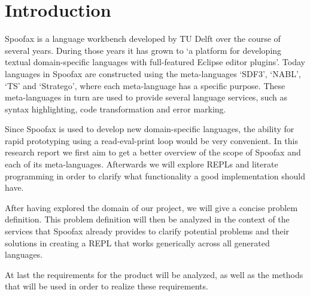 \section*{Introduction}
\label{sec:introduction}

Spoofax is a language workbench developed by TU Delft over the course of several
years. During those years it has grown to `a platform for developing textual
domain-specific languages with full-featured Eclipse editor plugins'.
Today languages in Spoofax are constructed using the meta-languages `SDF3',
`NABL', `TS' and `Stratego', where each meta-language has a specific purpose.
These meta-languages in turn are used to provide several language services,
such as syntax highlighting, code transformation and error marking.

Since Spoofax is used to develop new domain-specific languages, the ability
for rapid prototyping using a read-eval-print loop would be very convenient.
In this research report we first aim to get a better overview of the scope
of Spoofax and each of its meta-languages. Afterwards we will explore
REPLs and literate programming in order to clarify what functionality
a good implementation should have.

After having explored the domain of our project, we will give a concise
problem definition. This problem definition will then be analyzed in the context
of the services that Spoofax already provides to clarify potential problems
and their solutions in creating a REPL that works generically across all
generated languages.

At last the requirements for the product will be analyzed, as well as the
methods that will be used in order to realize these requirements.

